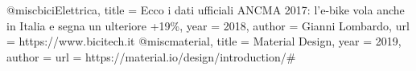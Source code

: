@misc{biciElettrica,
title = {Ecco i dati ufficiali ANCMA 2017: l’e-bike vola anche in Italia e segna un ulteriore +19\%},
year = {2018},
author = {Gianni Lombardo},
url = {https://www.bicitech.it}
}
@misc{material,
title = {Material Design},
year = {2019},
author = 
url = {https://material.io/design/introduction/#}
}